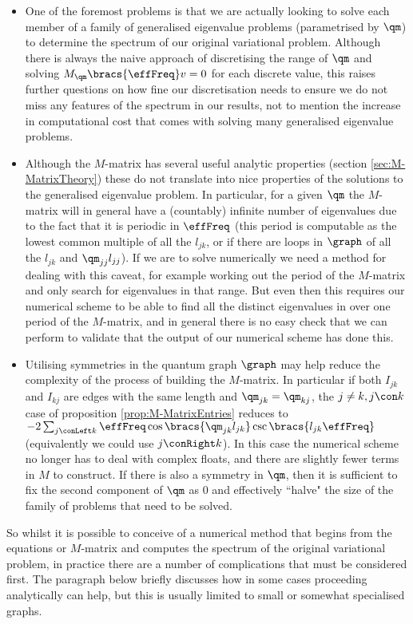 \begin{itemize}
	\item One of the foremost problems is that we are actually looking to solve each member of a family of generalised eigenvalue problems (parametrised by $\qm$) to determine the spectrum of our original variational problem.
	Although there is always the naive approach of discretising the range of $\qm$ and solving $M_{\qm}\bracs{\effFreq}v=0$ for each discrete value, this raises further questions on how fine our discretisation needs to ensure we do not miss any features of the spectrum in our results, not to mention the increase in computational cost that comes with solving many generalised eigenvalue problems.
	\item Although the $M$-matrix has several useful analytic properties (section \ref{sec:M-MatrixTheory}) these do not translate into nice properties of the solutions to the generalised eigenvalue problem.
	In particular, for a given $\qm$ the $M$-matrix will in general have a (countably) infinite number of eigenvalues due to the fact that it is periodic in $\effFreq$ (this period is computable as the lowest common multiple of all the $l_{jk}$, or if there are loops in $\graph$ of all the $l_{jk}$ and $\qm_{jj}l_{jj}$).
	If we are to solve numerically we need a method for dealing with this caveat, for example working out the period of the $M$-matrix and only search for eigenvalues in that range.
	But even then this requires our numerical scheme to be able to find all the distinct eigenvalues in over one period of the $M$-matrix, and in general there is no easy check that we can perform to validate that the output of our numerical scheme has done this.
	\item Utilising symmetries in the quantum graph $\graph$ may help reduce the complexity of the process of building the $M$-matrix.
	In particular if both $I_{jk}$ and $I_{kj}$ are edges with the same length and $\qm_{jk}=\qm_{kj}$, the $j\neq k, j\con k$ case of proposition \ref{prop:M-MatrixEntries} reduces to $-2\sum_{j\conLeft k}\effFreq\cos\bracs{\qm_{jk}l_{jk}}\csc\bracs{l_{jk}\effFreq}$ (equivalently we could use $j\conRight k$).
	In this case the numerical scheme no longer has to deal with complex floats, and there are slightly fewer terms in $M$ to construct.
	If there is also a symmetry in $\qm$, then it is sufficient to fix the second component of $\qm$ as 0 and effectively ``halve" the size of the family of problems that need to be solved.
\end{itemize}
So whilst it is possible to conceive of a numerical method that begins from the equations or $M$-matrix and computes the spectrum of the original variational problem, in practice there are a number of complications that must be considered first.
The paragraph below briefly discusses how in some cases proceeding analytically can help, but this is usually limited to small or somewhat specialised graphs. \newline

